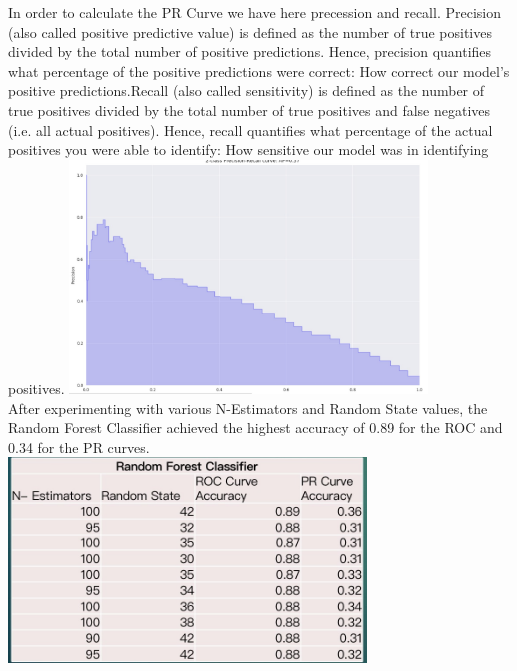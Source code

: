 In order to calculate the PR Curve we have here precession and recall. Precision (also called positive predictive value) is defined as the number of true positives divided by the total number of positive predictions. Hence, precision quantifies what percentage of the positive predictions were correct: How correct our model's positive predictions.Recall (also called sensitivity) is defined as the number of true positives divided by the total number of true positives and false negatives (i.e. all actual positives). Hence, recall quantifies what percentage of the actual positives you were able to identify: How sensitive our model was in identifying positives.
\includegraphics[width=9.5cm, height=8cm \textwidth]{pr.jpeg}\\

After experimenting with various N-Estimators and Random State values, the Random Forest Classifier achieved the highest accuracy of 0.89 for the ROC and 0.34 for the PR curves.\\

\includegraphics[width=9.5cm, height=8cm \textwidth]{ra.jpeg}\\
